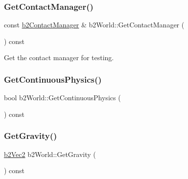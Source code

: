 \mbox{\label{classb2_world_a3d321151cd851d39bdc8fe52a5be426c}} 
\subsubsection{\texorpdfstring{GetContactManager()}{GetContactManager()}}
{\footnotesize\ttfamily const \mbox{\hyperlink{classb2_contact_manager}{b2\+Contact\+Manager}} \& b2\+World\+::\+Get\+Contact\+Manager (\begin{DoxyParamCaption}{ }\end{DoxyParamCaption}) const\hspace{0.3cm}{\ttfamily [inline]}}



Get the contact manager for testing. 

\mbox{\label{classb2_world_afec853cfec7a8bbffc20d4acc99963e7}} 
\subsubsection{\texorpdfstring{GetContinuousPhysics()}{GetContinuousPhysics()}}
{\footnotesize\ttfamily bool b2\+World\+::\+Get\+Continuous\+Physics (\begin{DoxyParamCaption}{ }\end{DoxyParamCaption}) const\hspace{0.3cm}{\ttfamily [inline]}}

\mbox{\label{classb2_world_abd41cdde8eaa3d1c58d2f00eaf688ec3}} 
\subsubsection{\texorpdfstring{GetGravity()}{GetGravity()}}
{\footnotesize\ttfamily \mbox{\hyperlink{structb2_vec2}{b2\+Vec2}} b2\+World\+::\+Get\+Gravity (\begin{DoxyParamCaption}{ }\end{DoxyParamCaption}) const\hspace{0.3cm}{\ttfamily [inline]}}



